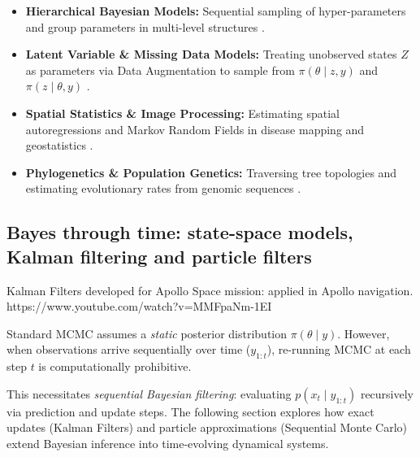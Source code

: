 \begin{itemize}
    \item \textbf{Hierarchical Bayesian Models:} Sequential sampling of hyper-parameters and group parameters in multi-level structures \cite{gelman2013bayesian}.
    \item \textbf{Latent Variable \& Missing Data Models:} Treating unobserved states $Z$ as parameters via Data Augmentation to sample from $\pi(\theta \mid z, y)$ and $\pi(z \mid \theta, y)$ \cite{tannerwong1987}.
    \item \textbf{Spatial Statistics \& Image Processing:} Estimating spatial autoregressions and Markov Random Fields in disease mapping and geostatistics \cite{besag1974spatial}.
    \item \textbf{Phylogenetics \& Population Genetics:} Traversing tree topologies and estimating evolutionary rates from genomic sequences \cite{yang2014molecular}.
\end{itemize}




\subsection{Bayes through time: state-space models, Kalman filtering and particle filters}


Kalman Filters developed for Apollo Space mission:  applied in Apollo navigation.
https://www.youtube.com/watch?v=MMFpaNm-1EI




Standard MCMC assumes a \emph{static} posterior distribution $\pi(\theta \mid y)$. However, when observations arrive sequentially over time ($y_{1:t}$), re-running MCMC at each step $t$ is computationally prohibitive. 

\cite{sequentialMCinvitation2022}

This necessitates \emph{sequential Bayesian filtering}: evaluating $p(x_t \mid y_{1:t})$ recursively via prediction and update steps. The following section explores how exact updates (Kalman Filters) and particle approximations (Sequential Monte Carlo) extend Bayesian inference into time-evolving dynamical systems.


